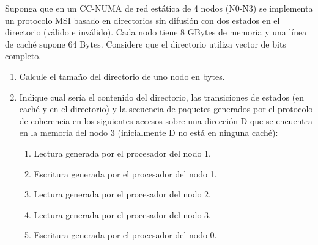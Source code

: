 \begin{ejercicio}
    Suponga que en un CC-NUMA de red estática de 4 nodos (N0-N3) se implementa un protocolo
    MSI basado en directorios sin difusión con dos estados en el directorio (válido e inválido). Cada nodo tiene 8
    GBytes de memoria y una línea de caché supone 64 Bytes. Considere que el directorio utiliza vector de bits
    completo.
    \begin{enumerate}
        \item Calcule el tamaño del directorio de uno nodo en bytes.
        \item Indique cual sería el contenido del directorio, las transiciones de estados (en caché y en el directorio) y la secuencia de paquetes generados por el protocolo de coherencia en los siguientes accesos sobre una dirección D que se encuentra en la memoria del nodo 3 (inicialmente D no está en ninguna caché):
        \begin{enumerate}
            \item Lectura generada por el procesador del nodo 1.
            \item Escritura generada por el procesador del nodo 1.
            \item Lectura generada por el procesador del nodo 2.
            \item Lectura generada por el procesador del nodo 3.
            \item Escritura generada por el procesador del nodo 0.
        \end{enumerate}
    \end{enumerate}
\end{ejercicio}

